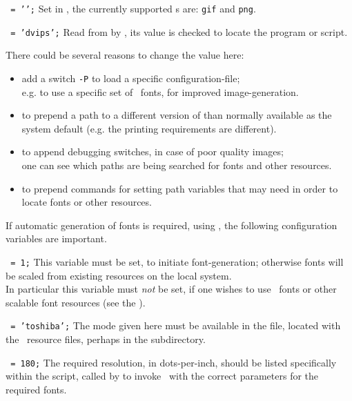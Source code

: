 \begin{htmllist}
\item [\fn{\$IMAGE\_TYPE}\texttt{ = '\Meta{image-type}';}]
Set in , the currently supported s
are: \texttt{gif} and \texttt{png}.

\item [\fn{\$DVIPS}\texttt{ = 'dvips';}]
Read from  by , 
its value is checked to locate the  program or script.

\smallskip\noindent
There could be several reasons to change the value here:
\begin{itemize}
\item
add a switch \texttt{-P} to load a specific configuration-file;\\
e.g. to use a specific set of \PS\ fonts, for improved image-generation.
\item
to prepend a path to a different version of  than normally
available as the system default (e.g. the printing requirements are different).
\item
to append debugging switches, in case of poor quality images;\\
one can see which paths are being searched for fonts and other resources.
\item
to prepend commands for setting path variables that  may need
in order to locate fonts or other resources.
\end{itemize}

If automatic generation of fonts is required, using \MF, the following
configuration variables are important.
%
\begin{htmllist}%
%
\item [\fn{\$PK\_GENERATION}\texttt{ = 1;}\label{pkgen}]
This variable must be set, to initiate font-generation; otherwise fonts
will be scaled from existing resources on the local system.\\
In particular this variable must \emph{not} be set, if one wishes to use
\PS\ fonts or other scalable font resources 
(see the  ).

\item [\fn{\$DVIPS\_MODE}\texttt{ = 'toshiba';}]
The mode given here must be available in the  file,
located with the \MF\ resource files, perhaps in the  subdirectory.

\item [\fn{\$METAFONT\_DPI}\texttt{ = 180;}]
The required resolution, in dots-per-inch, should be listed specifically
within the  script, called by  to invoke \MF\ with
the correct parameters for the required fonts.
%
\end{htmllist}



\end{htmllist}
